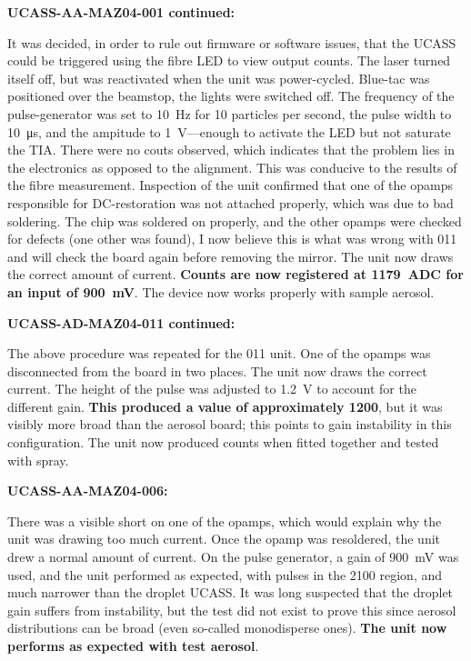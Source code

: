 

\textbf{UCASS-AA-MAZ04-001 continued:}

It was decided, in order to rule out firmware or software issues, that the UCASS could be triggered using the fibre LED to view output counts. The laser turned itself off, but was reactivated when the unit was power-cycled. Blue-tac was positioned over the beamstop, the lights were switched off. The frequency of the pulse-generator was set to \SI{10}{\hertz} for 10 particles per second, the pulse width to \SI{10}{\micro\second}, and the ampitude to \SI{1}{\volt}---enough to activate the LED but not saturate the TIA. There were no couts observed, which indicates that the problem lies in the electronics as opposed to the alignment. This was conducive to the results of the fibre measurement. Inspection of the unit confirmed that one of the opamps responsible for DC-restoration was not attached properly, which was due to bad soldering. The chip was soldered on properly, and the other opamps were checked for defects (one other was found), I now believe this is what was wrong with 011 and will check the board again before removing the mirror. The unit now draws the correct amount of current. \textbf{Counts are now registered at \SI{1179}{ADC} for an input of \SI{900}{\milli\volt}}. The device now works properly with sample aerosol.

\textbf{UCASS-AD-MAZ04-011 continued:}

The above procedure was repeated for the 011 unit. One of the opamps was disconnected from the board in two places. The unit now draws the correct current. The height of the pulse was adjusted to \SI{1.2}{\volt} to account for the different gain. \textbf{This produced a value of approximately 1200}, but it was visibly more broad than the aerosol board; this points to gain instability in this configuration. The unit now produced counts when fitted together and tested with spray.

\textbf{UCASS-AA-MAZ04-006:}

There was a visible short on one of the opamps, which would explain why the unit was drawing too much current. Once the opamp was resoldered, the unit drew a normal amount of current. On the pulse generator, a gain of \SI{900}{\milli\volt} was used, and the unit performed as expected, with pulses in the 2100 region, and much narrower than the droplet UCASS. It was long suspected that the droplet gain suffers from instability, but the test did not exist to prove this since aerosol distributions can be broad (even so-called monodisperse ones). \textbf{The unit now performs as expected with test aerosol}.

